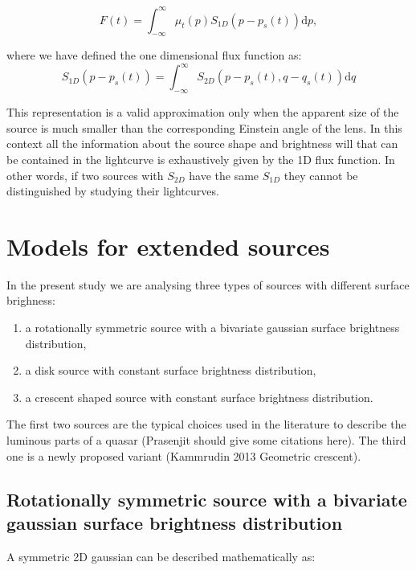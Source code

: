\begin{equation}
 F(t) 
= \int_{-\infty}^\infty  \mu_t(p) S_{1D}\left(p-p_s(t)\right) \mathrm{d}p,
\end{equation}

where we have defined the one dimensional flux function as:
\begin{equation}
 S_{1D}(p-p_s(t)) = \int_{-\infty}^\infty S_{2D}(p-p_s(t), q-q_s(t)) \mathrm{d}q
\end{equation}

This representation is a valid approximation only when the apparent size of the source is much smaller than the corresponding Einstein angle of the lens. In this context 
all the information about the source shape and brightness will that can be contained in the lightcurve is exhaustively given by the 1D flux function.
In other words, if two sources with $S_{2D}$ have the same $S_{1D}$ they cannot be distinguished by studying their lightcurves.
 
 
\section{Models for extended sources}

In the present study we are analysing three types of sources with different surface brighness: 
\begin{enumerate}
 \renewcommand{\theenumi}{(\arabic{enumi})}
  \item a rotationally symmetric source with a bivariate gaussian surface brightness distribution,
  \item a disk source with constant surface brightness distribution,
  \item a crescent shaped source with constant surface brightness distribution.
\end{enumerate}
The first two sources are the typical choices used in the literature to describe the luminous parts of a quasar (Prasenjit should give some citations here). The third one is a newly proposed
variant (Kammrudin 2013 Geometric crescent).




\subsection{Rotationally symmetric source with a bivariate gaussian surface brightness distribution}

A symmetric 2D gaussian can be described mathematically as:

